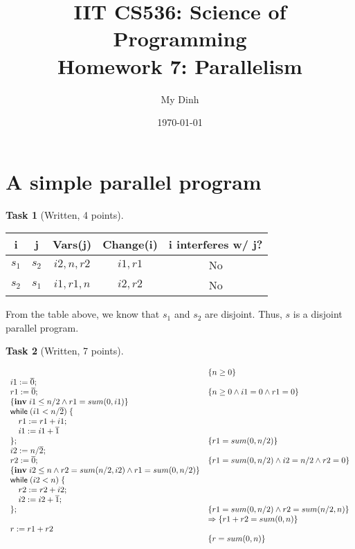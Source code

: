 \documentclass{article}
\title{IIT CS536: Science of Programming\\
  {\large Homework 7: Parallelism}}
\author{My Dinh}
\date{\today}
\newcommand{\stmt}[1]{\text{\sffamily #1}}
\newcommand{\while}[1]{\stmt{while}\;(#1)\;\{}
\newcommand{\assign}[2]{#1 := #2}
\newcommand{\const}[1]{\overline{#1}}
\newcommand{\inv}[1]{\{\textbf{inv}\;\ensuremath{#1}\}}
\theoremstyle{task}
\newtheorem{task}{Task}[section]
\begin{document}
\maketitle

\section{A simple parallel program}

\begin{task}[Written, 4 points]
\end{task}
\begin{center}
    \begin{tabular}{c | c | c | c | c}
        i & j & Vars(j) & Change(i) & i interferes w/ j? \\
        \hline
        $s_1$ & $s_2$ & $i2, n, r2$ & $i1, r1$ & No \\
        $s_2$ & $s_1$ & $i1, r1, n$ & $i2, r2$ & No \\
    \end{tabular}
\end{center}
From the table above, we know that $s_1$ and $s_2$ are disjoint. Thus, $s$
is a disjoint parallel program.

\begin{task}[Written, 7 points]
\end{task}
\[
    \begin{array}{l l}
        & \{n \geq 0 \} \\
        \assign{i1}{\const{0}}; & \\
        \assign{r1}{\const{0}}; & \{n \geq 0 \wedge i1 = 0 \wedge r1 = 0\} \\
        \inv{i1 \leq n/2 \wedge r1 = sum(0, i1)} & \\
        \while{i1 < n/\const{2}} & \\
        \quad \assign{r1}{r1 + i1}; & \\
        \quad \assign{i1}{i1 + \const{1}} \\
        \}; & \{r1 = sum(0, n/2)\} \\
        \assign{i2}{n/\const{2}}; & \\
        \assign{r2}{\const{0}}; & \{r1 = sum(0, n/2) \wedge i2 = n/2 \wedge r2 = 0\} \\
        \inv{i2 \leq n \wedge r2 = sum(n/2, i2) \wedge r1 = sum(0, n/2)} & \\
        \while{i2 < n} & \\
        \quad \assign{r2}{r2 + i2}; & \\
        \quad \assign{i2}{i2 + \const{1}}; & \\
        \}; & \{r1 = sum(0, n/2) \wedge r2 = sum(n/2, n)\} \\
            & \Rightarrow \{r1 + r2 = sum(0, n)\} \\
        \assign{r}{r1 + r2} & \\
        & \{r = sum(0, n)\}
    \end{array}
\]
\end{document}
